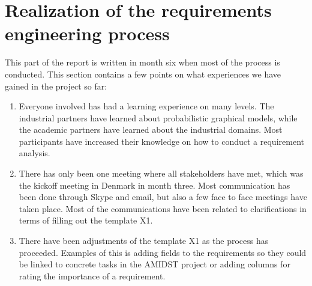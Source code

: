 
\section{Realization of the requirements engineering process}
\label{sec:realization}

This part of the report is written in month six when most of the process is conducted.  This section contains a few points on what experiences we have gained in the project so far:

\begin{enumerate}
\item Everyone involved has had a learning experience on many levels.  The industrial partners have learned about probabilistic graphical models, while the academic partners have learned about the industrial domains.  Most participants have increased their knowledge on how to conduct a requirement analysis. 
\item There has only been one meeting where all stakeholders have met, which was the kickoff meeting in Denmark in month three.  Most communication has been done through Skype and email, but also a few face to face meetings have taken place. Most of the communications have been related to clarifications in terms of filling out the template X1.
\item There have been adjustments of the template X1 as the process has proceeded.  Examples of this is adding fields to the requirements so they could be linked to concrete tasks in the AMIDST project or adding columns for rating the importance of a requirement.
\end{enumerate}
